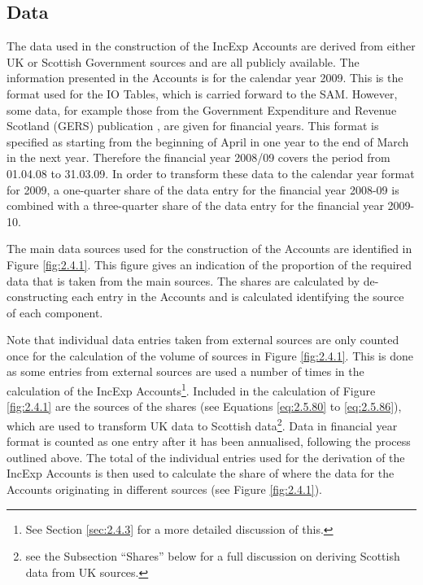 \bigskip
\subsection{Data}
\label{sec:2.4.1}

\bigskip

The data used in the construction of the IncExp Accounts are derived from either UK or Scottish Government sources and are all publicly available. The information presented in the Accounts is for the calendar year 2009. This is the format used for the IO Tables, which is carried forward to the SAM. However, some data, for example those from the Government Expenditure and Revenue Scotland (GERS) publication \cite{ScotGov2013b}, are given for financial years. This format is specified as starting from the beginning of April in one year to the end of March in the next year. Therefore the financial year 2008/09 covers the period from 01.04.08 to 31.03.09. In order to transform these data to the calendar year format for 2009, a one-quarter share of the data entry for the financial year 2008-09 is combined with a three-quarter share of the data entry for the financial year 2009-10.

\bigskip

The main data sources used for the construction of the Accounts are identified in Figure \ref{fig:2.4.1}. This figure gives an indication of the proportion of the required data that is taken from the main sources. The shares are calculated by de-constructing each entry in the Accounts and is calculated identifying the source of each component.

\bigskip

Note that individual data entries taken from external sources are only counted once for the calculation of the volume of sources in Figure \ref{fig:2.4.1}. This is done as some entries from external sources are used a number of times in the calculation of the IncExp Accounts\footnote{See Section \ref{sec:2.4.3} for a more detailed discussion of this.}. Included in the calculation of Figure \ref{fig:2.4.1} are the sources of the shares (see Equations \ref{eq:2.5.80} to \ref{eq:2.5.86}), which are used to transform UK data to Scottish data\footnote{see the Subsection ``Shares'' below for a full discussion on deriving Scottish data from UK sources.}. Data in financial year format is counted as one entry after it has been annualised, following the process outlined above. The total of the individual entries used for the derivation of the IncExp Accounts is then used to calculate the share of where the data for the Accounts originating in different sources (see Figure \ref{fig:2.4.1}).

